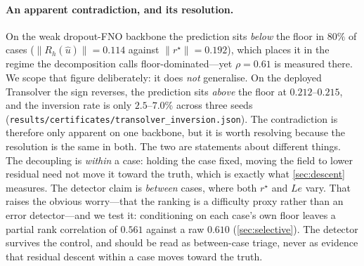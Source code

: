 \paragraph{An apparent contradiction, and its resolution.} On the weak dropout-FNO
backbone the prediction sits \emph{below} the floor in $80\%$ of cases
($\|R_h(\hat u)\|=0.114$ against $\|r^\star\|=0.192$), which places it in the regime the
decomposition calls floor-dominated---yet $\rho=0.61$ is measured there. We scope that
figure deliberately: it does \emph{not} generalise. On the deployed Transolver the sign
reverses, the prediction sits \emph{above} the floor at $0.212$--$0.215$, and the
inversion rate is only $2.5$--$7.0\%$ across three seeds
(\texttt{results/certificates/transolver\_inversion.json}). The contradiction is therefore
only apparent on one backbone, but it is worth resolving because the resolution is the
same in both. The two are statements about
different things. The decoupling is \emph{within} a case: holding the case fixed, moving
the field to lower residual need not move it toward the truth, which is exactly what
\autoref{sec:descent} measures. The detector claim is \emph{between} cases, where both
$r^\star$ and $Le$ vary. That raises the obvious worry---that the ranking is a difficulty
proxy rather than an error detector---and we test it: conditioning on each case's own floor
leaves a partial rank correlation of $0.561$ against a raw $0.610$
(\autoref{sec:selective}). The detector survives the control, and should be read as
between-case triage, never as evidence that residual descent within a case moves toward the
truth.

